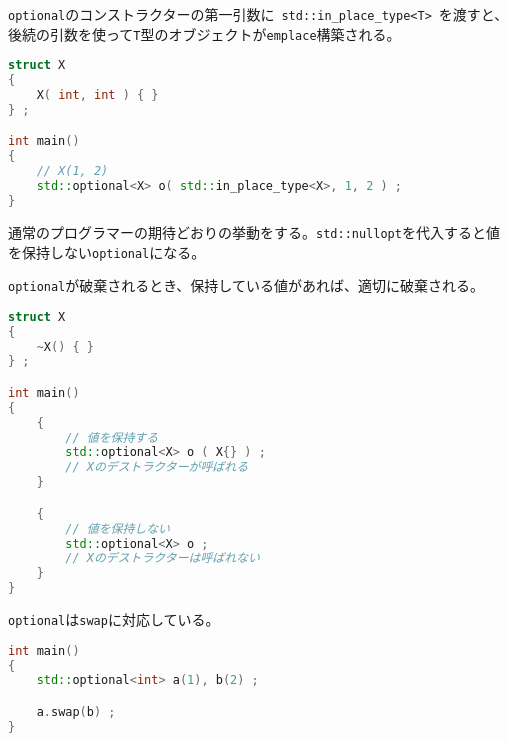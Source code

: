 \lstinline!optional!のコンストラクターの第一引数に~\lstinline!std::in_place_type<T>!~を渡すと、後続の引数を使って\lstinline!T!型のオブジェクトが\lstinline!emplace!構築される。

\begin{lstlisting}[language=C++]
struct X
{
    X( int, int ) { }
} ;

int main()
{
    // X(1, 2)
    std::optional<X> o( std::in_place_type<X>, 1, 2 ) ;
}
\end{lstlisting}

%

通常のプログラマーの期待どおりの挙動をする。\lstinline!std::nullopt!を代入すると値を保持しない\lstinline!optional!になる。

%

\lstinline!optional!が破棄されるとき、保持している値があれば、適切に破棄される。

\begin{lstlisting}[language=C++]
struct X
{
    ~X() { }
} ;

int main()
{
    {
        // 値を保持する
        std::optional<X> o ( X{} ) ;
        // Xのデストラクターが呼ばれる
    }

    {
        // 値を保持しない
        std::optional<X> o ;
        // Xのデストラクターは呼ばれない
    }   
}
\end{lstlisting}

%

\lstinline!optional!は\lstinline!swap!に対応している。

\begin{lstlisting}[language=C++]
int main()
{
    std::optional<int> a(1), b(2) ;

    a.swap(b) ;
}
\end{lstlisting}

%


